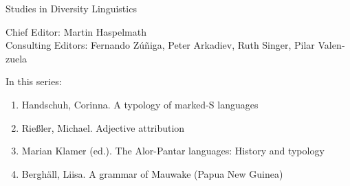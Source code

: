 
{\large Studies in Diversity Linguistics}

\bigskip

Chief Editor: Martin Haspelmath \\
Consulting Editors: Fernando Zúñiga, Peter Arkadiev, Ruth Singer, Pilar Valen­zuela

\bigskip

In this series:

\begin{enumerate}
\item Handschuh, Corinna. A typology of marked-S languages
\item Rießler, Michael. Adjective attribution
\item Marian Klamer (ed.). The Alor-Pantar languages: History and typology
\item Berghäll, Liisa. A grammar of Mauwake (Papua New Guinea)
\end{enumerate}


